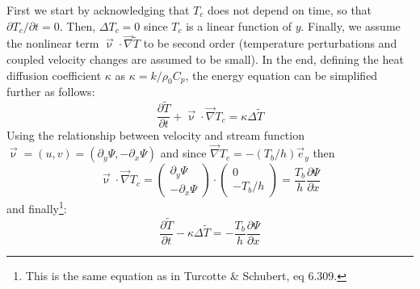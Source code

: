 First we start by acknowledging that $T_c$ does not depend on time, 
so that $\partial T_c/\partial t = 0$.
Then, $\Delta T_c=0$ since $T_c$ is a linear function of $y$.
Finally, we assume the nonlinear 
term ${\vec \upnu}\cdot {\vec \nabla} \tilde{T} $ to be second order (temperature perturbations and 
coupled velocity changes are assumed to be small).
In the end, defining the heat diffusion coefficient $\kappa$ as $\kappa =k/\rho_0 C_p$, the energy equation can be simplified further as follows:
\[
\frac{\partial \tilde{T}}{\partial t} + {\vec \upnu}\cdot {\vec \nabla} T_c 
= \kappa \Delta \tilde{T}
\]
Using the relationship between velocity and stream function
$\vec\upnu=(u,v)=(\partial_y \Psi, -\partial_x \Psi)$ and 
since $\vec\nabla T_c = - (T_b/h) \vec{e}_y$ then
\[
{\vec \upnu}\cdot {\vec \nabla} T_c =
\left(
\begin{array}{c}
\partial_y \Psi \\ 
-\partial_x \Psi
\end{array}
\right)
\cdot
\left(
\begin{array}{c}
0 \\ 
- T_b/h
\end{array}
\right)
=
\frac{T_b}{h}   \frac{\partial \Psi}{\partial x} 
\]
and finally\footnote{This is the same equation as in Turcotte \& Schubert, eq 6.309.}:
\begin{equation}
\boxed{
\frac{\partial \tilde{T}}{\partial t} - \kappa \Delta \tilde{T} 
= -  \frac{T_b}{h}   \frac{\partial \Psi}{\partial x}
}
\label{eq:biharm1}
\end{equation}


